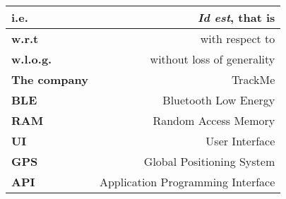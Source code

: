 \renewcommand{\arraystretch}{1.5}
\begin{center}
    \begin{tabular}{|l|r|}
        \hline
        \textbf{i.e.} & \textit{Id est}, that is  \\
        \hline
        \textbf{w.r.t} & with respect to  \\
        \hline
        \textbf{w.l.o.g.} & without loss of generality \\
        \hline
        \textbf{The company} & TrackMe \\
        \hline
        \textbf{BLE} & Bluetooth Low Energy \\
        \hline
        \textbf{RAM} & Random Access Memory \\
        \hline
        \textbf{UI} & User Interface \\
        \hline
        \textbf{GPS} & Global Positioning System \\
        \hline
        \textbf{API} & Application Programming Interface \\
        \hline
    \end{tabular}
\end{center}